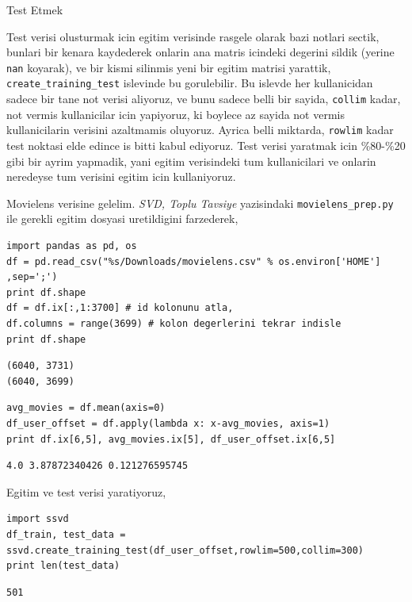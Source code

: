 \documentclass[12pt,fleqn]{article}\usepackage{../common}
\begin{document}
Test Etmek

Test verisi olusturmak icin egitim verisinde rasgele olarak bazi notlari
sectik, bunlari bir kenara kaydederek onlarin ana matris icindeki degerini
sildik (yerine \verb!nan!  koyarak), ve bir kismi silinmis yeni bir egitim
matrisi yarattik, \verb!create_training_test! islevinde bu gorulebilir. Bu
islevde her kullanicidan sadece bir tane not verisi aliyoruz, ve bunu
sadece belli bir sayida, \verb!collim! kadar, not vermis kullanicilar icin
yapiyoruz, ki boylece az sayida not vermis kullanicilarin verisini azaltmamis
oluyoruz. Ayrica belli miktarda, \verb!rowlim! kadar test noktasi elde
edince is bitti kabul ediyoruz. Test verisi yaratmak icin \%80-\%20 gibi
bir ayrim yapmadik, yani egitim verisindeki tum kullanicilari ve onlarin
neredeyse tum verisini egitim icin kullaniyoruz.

Movielens verisine gelelim. {\em SVD, Toplu Tavsiye} yazisindaki
\verb!movielens_prep.py! ile gerekli egitim dosyasi uretildigini
farzederek,

\begin{verbatim}
import pandas as pd, os
df = pd.read_csv("%s/Downloads/movielens.csv" % os.environ['HOME'] ,sep=';')
print df.shape
df = df.ix[:,1:3700] # id kolonunu atla,
df.columns = range(3699) # kolon degerlerini tekrar indisle
print df.shape
\end{verbatim}

\begin{verbatim}
(6040, 3731)
(6040, 3699)
\end{verbatim}

\begin{verbatim}
avg_movies = df.mean(axis=0)
df_user_offset = df.apply(lambda x: x-avg_movies, axis=1)
print df.ix[6,5], avg_movies.ix[5], df_user_offset.ix[6,5]
\end{verbatim}

\begin{verbatim}
4.0 3.87872340426 0.121276595745
\end{verbatim}

Egitim ve test verisi yaratiyoruz,

\begin{verbatim}
import ssvd
df_train, test_data = ssvd.create_training_test(df_user_offset,rowlim=500,collim=300)
print len(test_data)
\end{verbatim}

\begin{verbatim}
501
\end{verbatim}
\end{document}
